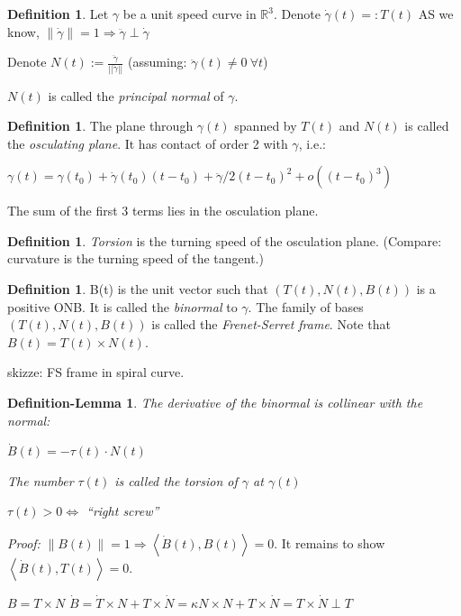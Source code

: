 \documentclass[a4paper,11pt,notitlepage,fullpage]{paper}
\newcommand{\dy}{\dot\gamma}
\newcommand{\ddy}{\ddot\gamma}
\theoremstyle{plain}
\newtheorem{defn-lem}[thm]{Definition-Lemma}
\theoremstyle{definition}
\newtheorem{defn}[thm]{Definition} %
\begin{document}
\begin{defn}
Let $\gamma$ be a unit speed curve in $\mathbb R^3$. Denote $\dy(t) =: T(t)$ AS we know, $\left\|\dy\right\| = 1 \Rightarrow \ddy \perp \dy$

Denote $N(t) := \frac{\ddy}{||\ddy||}$ (assuming: $\ddy(t) \neq 0 ~\forall t$)

$N(t)$ is called the \emph{principal normal} of $\gamma$.
\end{defn}

\begin{defn}
The plane through $\gamma(t)$ spanned by $T(t)$ and $N(t)$ is called the \emph{osculating plane}. It has contact of order 2 with $\gamma$, i.e.:

$\gamma(t) = \gamma(t_0) + \dy(t_0)(t-t_0) + \ddy/2(t-t_0)^2 + o((t-t_0)^3)$

The sum of the first 3 terms lies in the osculation plane.
\end{defn}

\begin{defn}
\emph{Torsion} is the turning speed of the osculation plane. (Compare: curvature is the turning speed of the tangent.)
\end{defn}

\begin{defn}
B(t) is the unit vector such that $(T(t), N(t), B(t))$ is a positive ONB. It is called the \emph{binormal} to $\gamma$. The family of bases $(T(t), N(t), B(t))$ is called the \emph{Frenet-Serret frame}. Note that $B(t) = T(t) \times N(t).$
\end{defn}

skizze: FS frame in spiral curve.

\begin{defn-lem}
The derivative of the binormal is collinear with the normal:

$\dot B(t) = -\tau(t) \cdot N(t)$

The number $\tau(t)$ is called the \emph{torsion} of $\gamma$ at $\gamma(t)$

$\tau(t) > 0 \Leftrightarrow$ ``right screw''
\end{defn-lem}

\emph{Proof:} $\left\|B(t)\right\| = 1 \Rightarrow \left\langle\dot B(t), B(t)\right\rangle = 0$. It remains to show $\left\langle\dot B(t), T(t)\right\rangle = 0$.

$B = T \times N$
$\dot B = \dot T \times N + T\times \dot N = \kappa N\times N + T\times \dot N = T\times \dot N \perp T$
\end{document}
